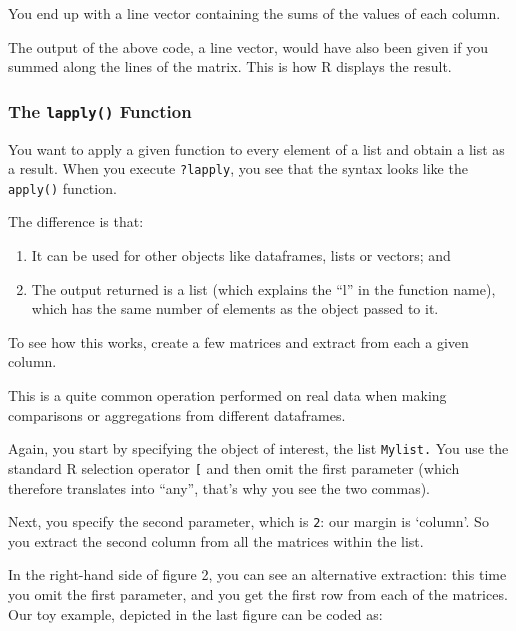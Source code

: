 \documentclass[
]{book}
\providecommand{\tightlist}{%
  \setlength{\itemsep}{0pt}\setlength{\parskip}{0pt}}
\theoremstyle{definition}
\theoremstyle{definition}
\theoremstyle{definition}
\theoremstyle{definition}
\theoremstyle{remark}
\begin{document}
You end up with a line vector containing the sums of the values of each column.

The output of the above code, a line vector, would have also been given if you summed along the lines of the matrix. This is how R displays the result.

\hypertarget{the-lapply-function}{%
\subsubsection{\texorpdfstring{The \texttt{lapply()} Function}{The lapply() Function}}\label{the-lapply-function}}

You want to apply a given function to every element of a list and obtain a list as a result. When you execute \texttt{?lapply}, you see that the syntax looks like the \texttt{apply()} function.

The difference is that:

\begin{enumerate}
\def\labelenumi{\arabic{enumi}.}
\tightlist
\item
  It can be used for other objects like dataframes, lists or vectors; and
\item
  The output returned is a list (which explains the ``l'' in the function name), which has the same number of elements as the object passed to it.
\end{enumerate}

To see how this works, create a few matrices and extract from each a given column.

This is a quite common operation performed on real data when making comparisons or aggregations from different dataframes.

Again, you start by specifying the object of interest, the list \texttt{Mylist.} You use the standard R selection operator \texttt{{[}} and then omit the first parameter (which therefore translates into ``any'', that's why you see the two commas).

Next, you specify the second parameter, which is \texttt{2}: our margin is `column'. So you extract the second column from all the matrices within the list.

In the right-hand side of figure 2, you can see an alternative extraction: this time you omit the first parameter, and you get the first row from each of the matrices. Our toy example, depicted in the last figure can be coded as:
\end{document}
